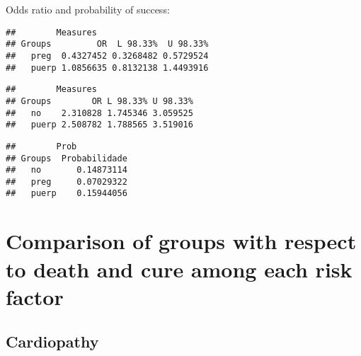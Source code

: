 \documentclass[
]{article}
\newenvironment{Shaded}{\begin{snugshade}}{\end{snugshade}}
\newcommand{\CommentTok}[1]{\textcolor[rgb]{0.56,0.35,0.01}{\textit{#1}}}
\newcommand{\KeywordTok}[1]{\textcolor[rgb]{0.13,0.29,0.53}{\textbf{#1}}}
\newcommand{\NormalTok}[1]{#1}
\newcommand{\OperatorTok}[1]{\textcolor[rgb]{0.81,0.36,0.00}{\textbf{#1}}}
\begin{document}
Odds ratio and probability of success:

\begin{Shaded}
\end{Shaded}

\begin{verbatim}
##        Measures
## Groups         OR  L 98.33%  U 98.33%
##   preg  0.4327452 0.3268482 0.5729524
##   puerp 1.0856635 0.8132138 1.4493916
\end{verbatim}

\begin{Shaded}
\end{Shaded}

\begin{verbatim}
##        Measures
## Groups        OR L 98.33% U 98.33%
##   no    2.310828 1.745346 3.059525
##   puerp 2.508782 1.788565 3.519016
\end{verbatim}

\begin{Shaded}
\end{Shaded}

\begin{verbatim}
##        Prob
## Groups  Probabilidade
##   no       0.14873114
##   preg     0.07029322
##   puerp    0.15944056
\end{verbatim}

\hypertarget{comparison-of-groups-with-respect-to-death-and-cure-among-each-risk-factor}{%
\section{Comparison of groups with respect to death and cure among each
risk
factor}\label{comparison-of-groups-with-respect-to-death-and-cure-among-each-risk-factor}}

\hypertarget{cardiopathy}{%
\subsection{Cardiopathy}\label{cardiopathy}}
\end{document}
